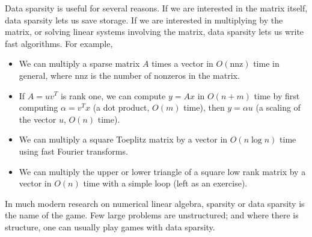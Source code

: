 \documentclass[12pt, leqno]{article}
\begin{document}
Data sparsity is useful for several reasons.  If we are interested
in the matrix itself, data sparsity lets us save storage.  If we are
interested in multiplying by the matrix, or solving linear systems
involving the matrix, data sparsity lets us write fast algorithms.
For example,
\begin{itemize}
\item We can multiply a sparse matrix $A$ times a vector in
  $O(\mbox{nnz})$ time in general, where nnz is the number of
  nonzeros in the matrix.
\item If $A = uv^T$ is rank one, we can compute $y = Ax$ in
  $O(n+m)$ time by first computing $\alpha = v^T x$ (a dot product, $O(m)$
  time), then $y = \alpha u$ (a scaling of the vector $u$, $O(n)$
  time).
\item We can multiply a square Toeplitz matrix by a vector in
  $O(n \log n)$ time using fast Fourier transforms.
\item We can multiply the upper or lower triangle of a square low rank
  matrix by a vector in $O(n)$ time with a simple loop (left as an
  exercise).
\end{itemize}
In much modern research on numerical linear algebra, sparsity or
data sparsity is the name of the game.  Few large problems are
unstructured; and where there is structure, one can usually play
games with data sparsity.
\end{document}
